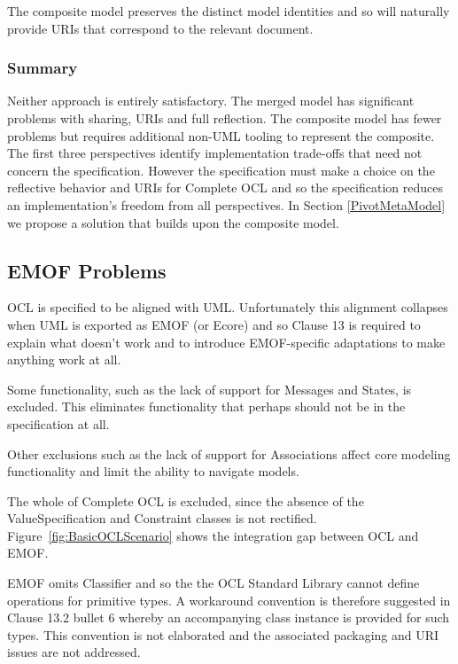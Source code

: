 \documentclass{eceasst}
\begin{document}
The composite model preserves the distinct model identities and so will naturally provide URIs that correspond to the relevant document.

\subsubsection{Summary}

Neither approach is entirely satisfactory. The merged model has significant problems with sharing, URIs and full reflection. The composite model has fewer problems but requires additional non-UML tooling to represent the composite. The first three perspectives identify implementation trade-offs that need not concern the specification. However the specification must make a choice on the reflective behavior and URIs for Complete OCL and so the specification reduces an implementation's freedom from all perspectives. In Section \ref{PivotMetaModel} we propose a solution that builds upon the composite model.

\subsection{EMOF Problems}\label{EMOF}

OCL is specified to be aligned with UML. Unfortunately this alignment collapses when UML is exported as EMOF (or Ecore) and so Clause 13 is required to explain what doesn't work and to introduce EMOF-specific adaptations to make anything work at all.

Some functionality, such as the lack of support for Messages and States,  is excluded. This eliminates functionality that perhaps should not be in the specification at all.

Other exclusions such as the lack of support for Associations affect core modeling functionality and limit the ability to navigate models.

The whole of Complete OCL is excluded, since the absence of the ValueSpecification and Constraint classes is not rectified. Figure~\ref{fig:BasicOCLScenario} shows the integration gap between OCL and EMOF.

EMOF omits Classifier and so the the OCL Standard Library cannot define operations for primitive types. A workaround convention is therefore suggested in  Clause 13.2 bullet 6 whereby an accompanying class instance is provided for such types. This convention is not elaborated and the associated packaging and URI issues are not addressed.
\end{document}
